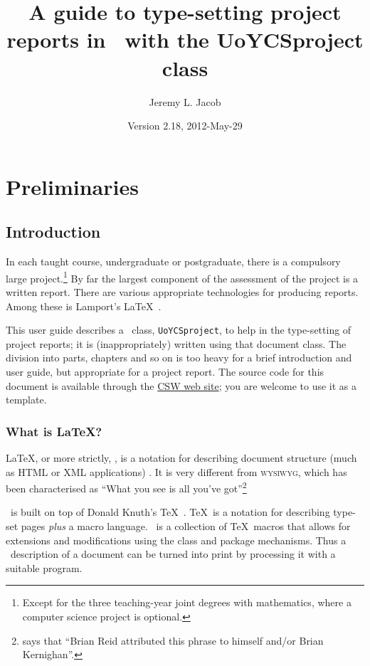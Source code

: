 \documentclass[authoryearcitations]{UoYCSproject}
\author{Jeremy L. Jacob}
\title{A guide to type-setting project reports in \LaTeXe\ with the
  \textsf{UoYCSproject} class}
\date{Version 2.18, 2012-May-29}
\begin{document}
\maketitle
\listoffigures
\listoftables
\renewcommand*{\lstlistlistingname}{List of Listings}
\lstlistoflistings

\cleardoublepage
\part{Preliminaries}
\label{sec:start}
\thispagestyle{empty}\cleardoublepage

\chapter{Introduction}
\label{cha:Introduction}

In each taught course, undergraduate or postgraduate, there is a
compulsory large project.\footnote{Except for the three teaching-year
  joint degrees with mathematics, where a computer science project is
  optional.}  By far the largest component of the assessment of the
project is a written report.  There are various appropriate
technologies for producing reports.  Among these is Lamport's \LaTeX\ 
\citep{Lamport1994}.

This user guide describes a \LaTeXe\ class, \lstinline|UoYCSproject|,
to help in the type-setting of project reports; it is
(inappropriately) written using that document class.  The division
into parts, chapters and so on is too heavy for a brief introduction
and user guide, but appropriate for a project report.  The source code
for this document is available through the
\href{http://www-course.cs.york.ac.uk/csw/}{CSW web site}; you are
welcome to use it as a template.

\section{What is \LaTeX?}
\label{sec:whatislatex}

\LaTeX, or more strictly, \LaTeXe, is a notation for describing
document structure (much as HTML or XML applications)
\citep{Lamport1994}.  It is very different from \textsc{wysiwyg},
which has been characterised as ``What you see is all you've
got''\footnote{\citet[p7, Footnote~1]{Lamport1994} says that ``Brian
  Reid attributed this phrase to himself and/or Brian Kernighan''.}

\LaTeXe\ is built on top of Donald Knuth's \TeX\ \citep{Knuth1984}.
\TeX\ is a notation for describing type-set pages \emph{plus} a macro
language.  \LaTeXe\ is a collection of \TeX\ macros that allows for
extensions and modifications using the class and package mechanisms.
Thus a \LaTeXe\ description of a document can be turned into print by
processing it with a suitable program.
\end{document}
